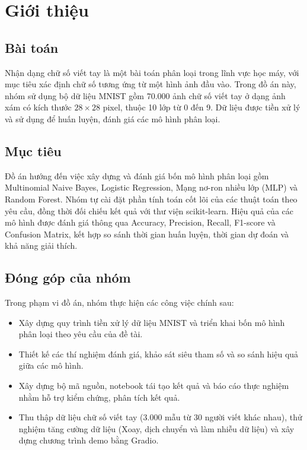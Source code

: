 \section{Giới thiệu}

\subsection{Bài toán}
Nhận dạng chữ số viết tay là một bài toán phân loại trong lĩnh vực
học máy, với mục tiêu xác định chữ số tương ứng từ một hình ảnh đầu vào.
Trong đồ án này, nhóm sử dụng bộ dữ liệu MNIST gồm 70.000 ảnh chữ số
viết tay ở dạng ảnh xám có kích thước $28 \times 28$ pixel, thuộc 10
lớp từ 0 đến 9. Dữ liệu được tiền xử lý và sử dụng để huấn luyện,
đánh giá các mô hình phân loại.

\subsection{Mục tiêu}
Đồ án hướng đến việc xây dựng và đánh giá bốn mô hình phân loại gồm
Multinomial Naive Bayes, Logistic Regression, Mạng nơ-ron nhiều lớp
(MLP) và Random Forest. Nhóm tự cài đặt phần tính toán cốt lõi của
các thuật toán theo yêu cầu, đồng thời đối chiếu kết quả với thư viện
scikit-learn. Hiệu quả của các mô hình được đánh giá thông qua
Accuracy, Precision, Recall, F1-score và Confusion Matrix, kết hợp
so sánh thời gian huấn luyện, thời gian dự đoán và khả năng giải thích.

\subsection{Đóng góp của nhóm}
Trong phạm vi đồ án, nhóm thực hiện các công việc chính sau:
\begin{itemize}
    \item Xây dựng quy trình tiền xử lý dữ liệu MNIST và triển khai
    bốn mô hình phân loại theo yêu cầu của đề tài.
    \item Thiết kế các thí nghiệm đánh giá, khảo sát siêu tham số
    và so sánh hiệu quả giữa các mô hình.
    \item Xây dựng bộ mã nguồn, notebook tái tạo kết quả và báo cáo
    thực nghiệm nhằm hỗ trợ kiểm chứng, phân tích kết quả.
    \item Thu thập dữ liệu chữ số viết tay (3.000 mẫu từ 30 người viết khác nhau), thử nghiệm tăng cường dữ liệu (Xoay, dịch chuyển và làm nhiễu dữ liệu) và xây dựng chương trình demo bằng Gradio.
    
\end{itemize}